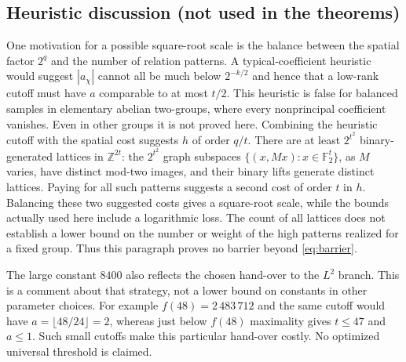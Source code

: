 \documentclass[11pt]{amsart}
\theoremstyle{remark}
\newcommand{\Z}{\mathbb Z}
\newcommand{\F}{\mathbb F}
\begin{document}
\subsection{Heuristic discussion (not used in the theorems)}
One motivation for a possible square-root scale is the balance between
the spatial factor $2^q$ and the number of relation patterns. A
typical-coefficient heuristic would suggest $|a_\chi|$ cannot all be
much below $2^{-k/2}$ and hence that a low-rank cutoff must have $a$
comparable to at most $t/2$. This heuristic is false for balanced
samples in elementary abelian two-groups, where every nonprincipal
coefficient vanishes. Even in other groups it is not proved here.
Combining the heuristic cutoff with the spatial cost suggests
$h$ of order $q/t$. There are at least $2^{t^2}$ binary-generated
lattices in $\Z^{2t}$: the $2^{t^2}$ graph subspaces
$\{(x,Mx):x\in\F_2^t\}$, as $M$ varies, have distinct mod-two
images, and their binary lifts generate distinct lattices. Paying
for all such patterns suggests a second cost of order $t$ in $h$.
Balancing these two suggested costs gives a square-root scale, while
the bounds actually used here include a logarithmic loss. The count
of all lattices does not establish a lower bound on the number or
weight of the high patterns realized for a fixed group. Thus this
paragraph proves no barrier beyond \eqref{eq:barrier}.

The large constant $8400$ also reflects the chosen hand-over to the
$L^2$ branch. This is a comment about that strategy, not a lower bound
on constants in other parameter choices. For example $f(48)=2\,483\,712$
and the same cutoff would have $a=\lfloor48/24\rfloor=2$, whereas
just below $f(48)$ maximality gives $t\le47$ and $a\le1$. Such
small cutoffs make this particular hand-over costly. No optimized
universal threshold is claimed.
\end{document}

